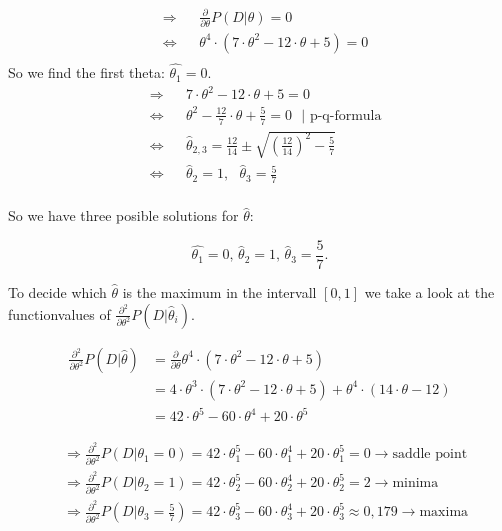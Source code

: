 \begin{align*}
    &\Rightarrow&&\frac{\partial}{\partial\theta} P(D|\theta)=0\\
    &\Leftrightarrow&&\theta^{4}\cdot(7\cdot\theta^{2}-12\cdot\theta+5)=0\\
\end{align*}
So we find the first theta: $\hat{\theta_{1}}=0$.\\

\begin{align*}
    &\Rightarrow&&7\cdot\theta^{2}-12\cdot\theta+5=0\\
    &\Leftrightarrow&&\theta^{2}-\frac{12}{7}\cdot\theta+\frac{5}{7}=0 \text{  }|\text{  p-q-formula}\\
    &\Leftrightarrow&&\hat{\theta}_{2,3}=\frac{12}{14}\pm\sqrt{\left(\frac{12}{14}\right)^{2}-\frac{5}{7}}\\
    &\Leftrightarrow&&\hat{\theta}_{2}=1, \text{  }\hat{\theta}_{3}=\frac{5}{7}\\
\end{align*}

So we have three posible solutions for $\hat{\theta}$:\\
\begin{center}
\begin{equation}
    \hat{\theta_{1}}=0\text{,  } \hat{\theta}_{2}=1\text{,  } \hat{\theta}_{3}=\frac{5}{7}.
\end{equation}
\end{center}
        
To decide which $\hat{\theta}$ is the maximum in the intervall $[0,1]$ we take a look at the functionvalues of $\frac{\partial^{2}}{\partial\theta^{2}}P(D|\hat{\theta}_{i})$.

\begin{align*}
    \frac{\partial^{2}}{\partial\theta^{2}}P(D|\hat{\theta}) &=\frac{\partial}{\partial\theta}\theta^{4}\cdot(7\cdot\theta^{2}-12\cdot\theta+5)\\
    &=4\cdot\theta^{3}\cdot(7\cdot\theta^{2}-12\cdot\theta+5)+\theta^{4}\cdot(14\cdot\theta-12)\\
    &=42\cdot\theta^{5}-60\cdot\theta^{4}+20\cdot\theta^{5}
\end{align*}

\begin{align*}
    &\Rightarrow\frac{\partial^{2}}{\partial\theta^{2}}P(D|\theta_{1}=0)=42\cdot\theta^{5}_{1}-60\cdot\theta^{4}_{1}+20\cdot\theta^{5}_{1}=0\rightarrow\text{saddle point}\\
    &\Rightarrow\frac{\partial^{2}}{\partial\theta^{2}}P(D|\theta_{2}=1)=42\cdot\theta^{5}_{2}-60\cdot\theta^{4}_{2}+20\cdot\theta^{5}_{2}=2\rightarrow\text{minima}\\
    &\Rightarrow\frac{\partial^{2}}{\partial\theta^{2}}P(D|\theta_{3}=\frac{5}{7})=42\cdot\theta^{5}_{3}-60\cdot\theta^{4}_{3}+20\cdot\theta^{5}_{3}\approx0,179\rightarrow\text{maxima}\\
\end{align*}

